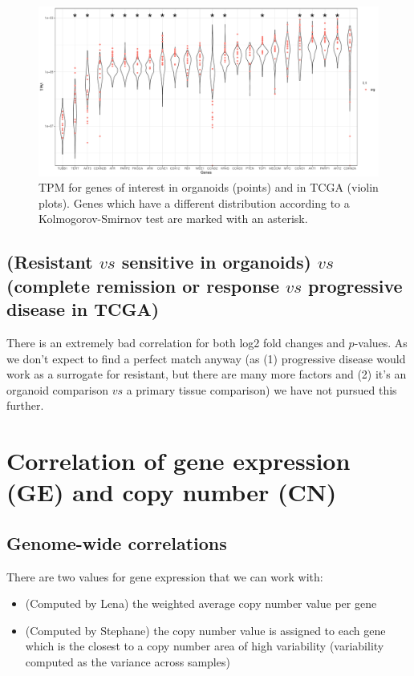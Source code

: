 \documentclass{article}
\begin{document}
\begin{figure}[h]
\centering
\includegraphics[width=\textwidth]{../../RNASeq_DE_resistant_sensitive/figures/Sensitive_resistant_figures/TPM_correlation_tcga_org_selected_genes.pdf}
\caption{TPM for genes of interest in organoids (points) and in TCGA (violin plots). Genes which have a different distribution according to a Kolmogorov-Smirnov test are marked with an asterisk.\label{tcga_org_cor_rnaseq}}
\end{figure}

\clearpage

\subsection{(Resistant $vs$ sensitive in organoids) $vs$ (complete remission or response $vs$ progressive disease in TCGA) }

There is an extremely bad correlation for both log2 fold changes and $p$-values. As we don't expect to find a perfect match anyway (as (1) progressive disease would work as a surrogate for resistant, but there are many more factors and (2) it's an organoid comparison $vs$ a primary tissue comparison) we have not pursued this further.

\section{Correlation of gene expression (GE) and copy number (CN)}

\subsection{Genome-wide correlations}
There are two values for gene expression that we can work with:
\begin{itemize}
\item (Computed by Lena) the weighted average copy number value per gene
\item (Computed by Stephane) the copy number value is assigned to each gene which is the closest to a copy number area of high variability (variability computed as the variance across samples)
\end{itemize}
\end{document}
